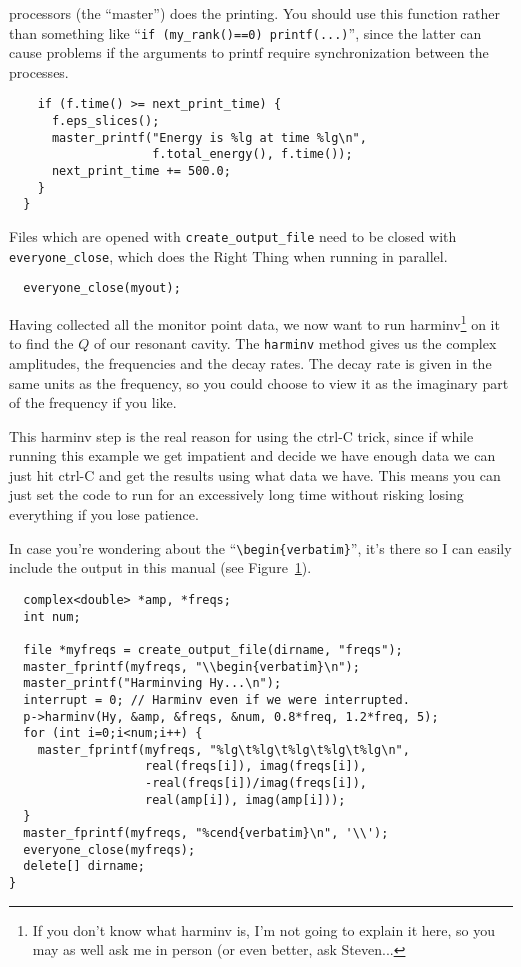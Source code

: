 processors (the ``master'') does the printing.  You should use this
function rather than something like
``\verb!if (my_rank()==0) printf(...)!'', since the latter can cause
problems if the arguments to printf require synchronization between the
processes.
\begin{verbatim}
    if (f.time() >= next_print_time) {
      f.eps_slices();
      master_printf("Energy is %lg at time %lg\n",
                    f.total_energy(), f.time());
      next_print_time += 500.0;
    }
  }
\end{verbatim}
Files which are opened with \verb!create_output_file! need to be closed
with \verb!everyone_close!, which does the Right Thing when running in
parallel.
\begin{verbatim}
  everyone_close(myout);
\end{verbatim}
Having collected all the monitor point data, we now want to run
harminv\footnote{If you don't know what harminv is, I'm not going to
explain it here, so you may as well ask me in person (or even better, ask
Steven...} on it to find the $Q$ of our resonant cavity.  The
\verb!harminv! method gives us the complex amplitudes, the frequencies and
the decay rates.  The decay rate is given in the same units as the
frequency, so you could choose to view it as the imaginary part of the
frequency if you like.

This harminv step is the real reason for using the ctrl-C trick, since if
while running this example we get impatient and decide we have enough data
we can just hit ctrl-C and get the results using what data we have.  This
means you can just set the code to run for an excessively long time without
risking losing everything if you lose patience.
\begin{figure}
\label{complicated_figure}
\begin{center}
\end{center}
\end{figure}

In case you're wondering about the ``\verb!\begin{verbatim}!'', it's there
so I can easily include the output in this manual (see
Figure~\ref{complicated_figure}).
\begin{verbatim}
  complex<double> *amp, *freqs;
  int num;
  
  file *myfreqs = create_output_file(dirname, "freqs");
  master_fprintf(myfreqs, "\\begin{verbatim}\n");
  master_printf("Harminving Hy...\n");
  interrupt = 0; // Harminv even if we were interrupted.
  p->harminv(Hy, &amp, &freqs, &num, 0.8*freq, 1.2*freq, 5);
  for (int i=0;i<num;i++) {
    master_fprintf(myfreqs, "%lg\t%lg\t%lg\t%lg\t%lg\n",
                   real(freqs[i]), imag(freqs[i]),
                   -real(freqs[i])/imag(freqs[i]),
                   real(amp[i]), imag(amp[i]));
  }
  master_fprintf(myfreqs, "%cend{verbatim}\n", '\\');
  everyone_close(myfreqs);
  delete[] dirname;
}
\end{verbatim}
